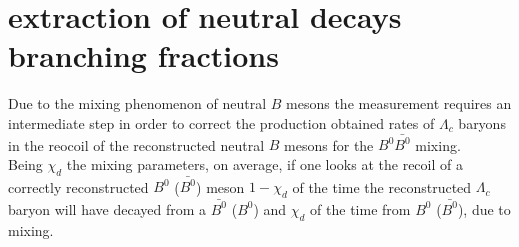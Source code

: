     \begin{table}[H]
        \centering
    \label{tab:SixStreams_chargedAntiCorrLamBR}
    \caption{charged anticorr}
    \end{table}

\section{extraction of neutral decays branching fractions}
Due to the mixing phenomenon of neutral $B$ mesons the measurement requires an intermediate step in order to correct the production 
obtained rates of $\Lambda_c$ baryons in the reocoil of the reconstructed neutral $B$ mesons for the $B^0\bar{B^0}$ mixing. \\
Being $\chi_d$ the mixing parameters, on average, if one looks at the recoil of a correctly reconstructed $B^0$ ($\bar{B^0}$) meson $1 - \chi_d$ of the time the reconstructed $\Lambda_c$ baryon
will have decayed from a $\bar{B^0}$ ($B^0$) and $\chi_d$ of the time from $B^0$ ($\bar{B^0}$), due to mixing.\\

